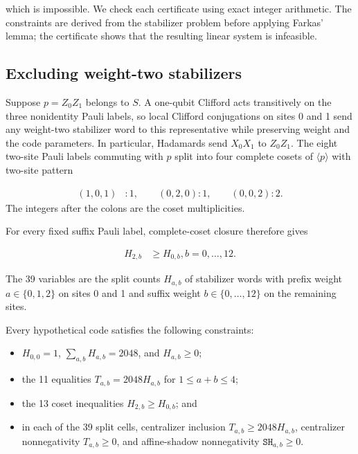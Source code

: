 \documentclass[11pt]{article}
\begin{document}
which is impossible. We check each certificate using exact integer arithmetic. The constraints are derived from the stabilizer problem before applying Farkas' lemma; the certificate shows that the resulting linear system is infeasible.

\subsection{Excluding weight-two stabilizers}\label{excluding-weight-two-stabilizers}

Suppose \(p=Z_{0} Z_{1}\) belongs to \(S\). A one-qubit Clifford acts transitively on the three nonidentity Pauli labels, so local Clifford conjugations on sites 0 and 1 send any weight-two stabilizer word to this representative while preserving weight and the code parameters. In particular, Hadamards send \(X_0X_1\) to \(Z_0Z_1\). The eight two-site Pauli labels commuting with \(p\) split into four complete cosets of \(\langle p \rangle\) with two-site pattern

\[
\begin{aligned}
(1,0,1)&:1, \qquad (0,2,0):1, \qquad (0,0,2):2.
\end{aligned}
\]
The integers after the colons are the coset multiplicities.

For every fixed suffix Pauli label, complete-coset closure therefore gives

\[
\begin{aligned}
H_{2,b}  &\ge  H_{0,b},   b=0,\dots,12.
\end{aligned}
\]

The 39 variables are the split counts \(H_{a,b}\) of stabilizer words with prefix weight \(a\in\{0,1,2\}\) on sites 0 and 1 and suffix weight \(b\in\{0,\ldots,12\}\) on the remaining sites.

Every hypothetical code satisfies the following constraints:

\begin{itemize}
\item \(H_{0,0}=1\), \(\sum_{a,b}H_{a,b}=2048\), and \(H_{a,b}\geq0\);
\item the 11 equalities \(T_{a,b}=2048H_{a,b}\) for \(1\leq a+b\leq4\);
\item the 13 coset inequalities \(H_{2,b}\geq H_{0,b}\); and
\item in each of the 39 split cells, centralizer inclusion \(T_{a,b}\geq2048H_{a,b}\), centralizer nonnegativity \(T_{a,b}\geq0\), and affine-shadow nonnegativity \(\mathtt{SH}_{a,b}\geq0\).
\end{itemize}
\end{document}
